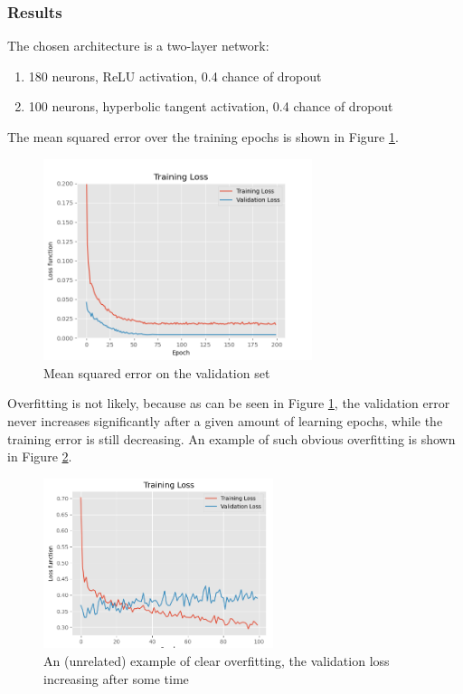 \subsubsection{Results}

The chosen architecture is a two-layer network:
\begin{enumerate}
    \item 180 neurons, ReLU activation, 0.4 chance of dropout
    \item 100 neurons, hyperbolic tangent activation, 0.4 chance of dropout
\end{enumerate}

The mean squared error over the training epochs is shown in Figure \ref{fig:nn-validation-error-curve}.

\begin{figure}[h]
    \centering
    \includegraphics[width=0.7\textwidth]{resources/images/mse-finalarch.png}
    \caption{Mean squared error on the validation set}
    \label{fig:nn-validation-error-curve}
\end{figure}

Overfitting is not likely, because as can be seen in Figure \ref{fig:nn-validation-error-curve}, the validation error never increases significantly after a given amount of learning epochs, while the training error is still decreasing. An example of such obvious overfitting is shown in Figure \ref{fig:overfitting}.

\begin{figure}[h]
    \centering
    \includegraphics[width=0.6\textwidth]{resources/images/overfitting.png}
    \caption{An (unrelated) example of clear overfitting, the validation loss increasing after some time}
    \label{fig:overfitting}
\end{figure}

